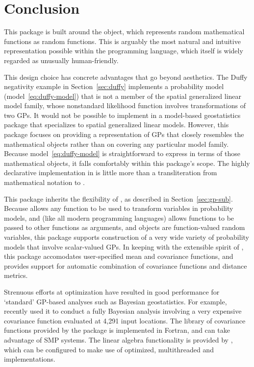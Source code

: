 \documentclass[article]{jss}
\begin{document}
\section{Conclusion}

This package is built around the  object, which represents random mathematical functions as random  functions. This is arguably the most natural and intuitive representation possible within the  programming language, which itself is widely regarded as unusually human-friendly. 

This design choice has concrete advantages that go beyond aesthetics. The Duffy negativity example in Section~\ref{sec:duffy} implements a probability model (model~\ref{eq:duffy-model}) that is not a member of the spatial generalized linear model family, whose nonstandard likelihood function involves transformations of two GPs. It would not be possible to implement in a model-based geostatistics package that specializes to spatial generalized linear models. However, this package focuses on providing a  representation of GPs that closely resembles the mathematical objects rather than on covering any particular model family. Because model~\ref{eq:duffy-model} is straightforward to express in terms of those mathematical objects, it falls comfortably within this package's scope. The highly declarative implementation in  is little more than a transliteration from mathematical notation to . 

This package inherits the flexibility of  \citep{pymc}, as described in Section~\ref{sec:gp-sub}. Because  allows any  function to be used to transform variables in probability models, and  (like all modern programming languages) allows functions to be passed to other functions as arguments, and  objects are function-valued random variables, this package supports construction of a very wide variety of probability models that involve scalar-valued GPs. In keeping with the extensible spirit of , this package accomodates user-specified mean and covariance functions, and provides support for automatic combination of covariance functions and distance metrics.

Strenuous efforts at optimization have resulted in good performance for `standard' GP-based analyses such as Bayesian geostatistics. For example, \cite{map} recently used it to conduct a fully Bayesian analysis involving a very expensive covariance function evaluated at 4,291 input locations. The library of covariance functions provided by the package is implemented in Fortran, and can take advantage of SMP systems. The linear algebra functionality is provided by , which can be configured to make use of optimized, multithreaded  \citep{blas} and  \citep{lapack}  implementations. 
\end{document}
